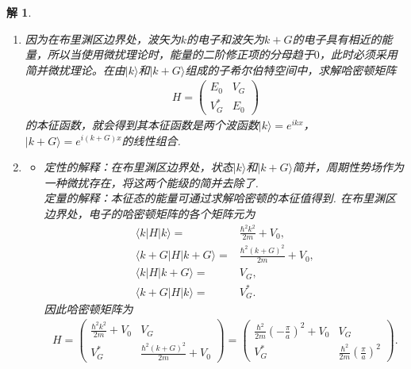 \documentclass[UTF8,10pt,a4paper]{article}
\theoremstyle{Problem}
\theoremstyle{Solution}
\newtheorem*{sol}{解}
\begin{document}
\begin{sol}
    \begin{enumerate}
        \item[(a)] 因为在布里渊区边界处，波矢为$k$的电子和波矢为$k+G$的电子具有相近的能量，所以当使用微扰理论时，能量的二阶修正项的分母趋于$0$，此时必须采用简并微扰理论。在由$\vert k\rangle$和$\vert k+G\rangle$组成的子希尔伯特空间中，求解哈密顿矩阵
        \begin{align}
            H=\left(\begin{matrix}
                E_0&V_G\\
                V_G^*&E_0
            \end{matrix}\right)
        \end{align}
        的本征函数，就会得到其本征函数是两个波函数$\vert k\rangle=e^{ikx}$，$\vert k+G\rangle=e^{i(k+G)x}$的线性组合.
        \item[(b)] 
        \begin{itemize}
            \item[$\triangleright$] 定性的解释：在布里渊区边界处，状态$\vert k\rangle$和$\vert k+G\rangle$简并，周期性势场作为一种微扰存在，将这两个能级的简并去除了.\\
            定量的解释：本征态的能量可通过求解哈密顿的本征值得到. 在布里渊区边界处，电子的哈密顿矩阵的各个矩阵元为
            \begin{align}
                \langle k\rvert H\lvert k\rangle=&\frac{\hbar^2k^2}{2m}+V_0,\\
                \langle k+G\rvert H\lvert k+G\rangle=&\frac{\hbar^2(k+G)^2}{2m}+V_0,\\
                \langle k\rvert H\lvert k+G\rangle=&V_G,\\
                \langle k+G\rvert H\lvert k\rangle=&V_G^*.
            \end{align}
            因此哈密顿矩阵为
            \begin{align}
                H=\left(\begin{matrix}
                    \frac{\hbar^2k^2}{2m}+V_0&V_G\\
                    V_G^*&\frac{\hbar^2(k+G)^2}{2m}+V_0
                \end{matrix}\right)=\left(\begin{matrix}
                    \frac{\hbar^2}{2m}\left(-\frac{\pi}{a}\right)^2+V_0&V_G\\
                    V_G^*&\frac{\hbar^2}{2m}\left(\frac{\pi}{a}\right)^2
                \end{matrix}\right).

\end{align}
\end{itemize}
\end{enumerate}
\end{sol}
\end{document}
